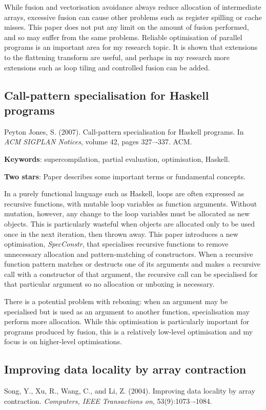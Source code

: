 \documentclass[12pt,a4paper]{article}
\begin{document}
While fusion and vectorisation avoidance always reduce allocation of intermediate arrays, excessive fusion can cause other problems such as register spilling or cache misses.
This paper does not put any limit on the amount of fusion performed, and so may suffer from the same problems.
Reliable optimisation of parallel programs is an important area for my research topic.
It is shown that extensions to the flattening transform are useful, and perhaps in my research more extensions such as loop tiling and controlled fusion can be added.

\subsection{Call-pattern specialisation for Haskell programs}
\cite{peyton2007call}
Peyton Jones, S. (2007). Call-pattern specialisation for Haskell programs. In \emph{ACM SIGPLAN Notices}, volume 42, pages 327–-337. ACM.

{\bf Keywords}: supercompilation, partial evaluation, optimisation, Haskell.

{\bf Two stars}: Paper describes some important terms or fundamental concepts.

In a purely functional language such as Haskell, loops are often expressed as recursive functions, with mutable loop variables as function arguments. 
Without mutation, however, any change to the loop variables must be allocated as new objects.
This is particularly wasteful when objects are allocated only to be used once in the next iteration, then thrown away.
This paper introduces a new optimisation, \emph{SpecConstr}, that 
specialises recursive functions to remove unnecessary allocation and pattern-matching of constructors.
When a recursive function pattern matches or destructs one of its arguments and makes a recursive call with a constructor of that argument,
the recursive call can be specialised for that particular argument so no allocation or unboxing is necessary.

There is a potential problem with reboxing: when an argument may be specialised but is used as an argument to another function, specialisation may perform more allocation.
While this optimisation is particularly important for programs produced by fusion, this is a relatively low-level optimisation and my focus is on higher-level optimisations.





\subsection{Improving data locality by array contraction}
\cite{song2004improving}
Song, Y., Xu, R., Wang, C., and Li, Z. (2004). Improving data locality by array contraction. \emph{Computers, IEEE Transactions on}, 53(9):1073–-1084.
\end{document}
